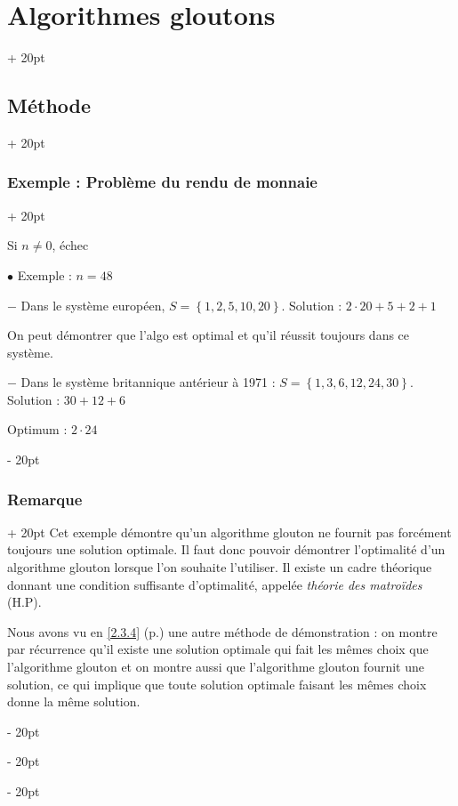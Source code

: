\documentclass[a4paper, 12pt, twoside]{article}
\newcommand{\set}[1]{\left\{ #1 \right\}}
\newcommand{\ind}[1][20pt]{\advance\leftskip + #1}
\newcommand{\deind}[1][20pt]{\advance\leftskip - #1}
\newenvironment{indt}[2][20pt]{#2 \par \ind[#1]}{\par \deind} %
\begin{document}
\begin{indt}{\section{Algorithmes gloutons}}
\begin{indt}{\subsection{Méthode}}
\begin{indt}{\subsubsection{Exemple : Problème du rendu de monnaie}}
\begin{pseudocode}
                    Si $n \neq 0$, échec
                \end{pseudocode}
                
                \vspace{12pt}
                
                $\bullet$ Exemple : $n = 48$
                
                $-$ Dans le système européen, $S = \set{1, 2, 5, 10, 20}$.
                Solution : $2 \cdot 20 + 5 + 2 + 1$
                
                On peut démontrer que l'algo est optimal et qu'il réussit toujours dans ce système.
                
                $-$ Dans le système britannique antérieur à 1971 : $S = \set{1, 3, 6, 12, 24, 30}$.
                Solution : $30 + 12 + 6$
                
                Optimum : $2 \cdot 24$
            \end{indt}
            
            \vspace{12pt}
            
            \begin{indt}{\subsubsection{Remarque}}
                Cet exemple démontre qu'un algorithme glouton ne fournit pas forcément toujours une solution optimale. Il faut donc pouvoir démontrer l'optimalité d'un algorithme glouton lorsque l'on souhaite l'utiliser. Il existe un cadre théorique donnant une condition suffisante d'optimalité, appelée \textit{théorie des matroïdes} (H.P).
                
                Nous avons vu en \ref{2.3.4} (p.\pageref{2.3.4}) une autre méthode de démonstration : on montre par récurrence qu'il existe une solution optimale qui fait les mêmes choix que l'algorithme glouton et on montre aussi que l'algorithme glouton fournit une solution, ce qui implique que toute solution optimale faisant les mêmes choix donne la même solution.
            \end{indt}
        \end{indt}
        
        \vspace{12pt}
        

\end{indt}
\end{document}
